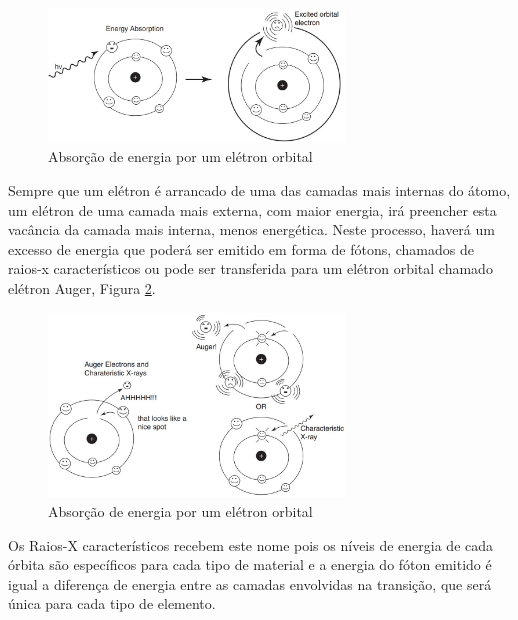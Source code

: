 \documentclass[11pt,a4paper]{article}
\begin{document}
                \begin{figure}[h]
                    \centering
                    \includegraphics[width=0.7\textwidth]{Imagens/absorcaoDeEnergiaPorEletronOrbital.jpg}
                    \caption{Absorção de energia por um elétron orbital}
                    \label{fig:absorcaoDeEnergiaPorEletronOrbital}
                \end{figure}

                Sempre que um elétron é arrancado de uma das camadas mais internas do átomo, um elétron de uma camada mais externa, com maior energia, irá preencher esta vacância da camada mais interna, menos energética. Neste processo, haverá um excesso de energia que poderá ser emitido em forma de fótons, chamados de raios-x característicos ou pode ser transferida para um elétron orbital chamado elétron Auger, Figura \ref{fig:emissaoRaiosXCaracteristicosEEletronAuger}.

                \begin{figure}[h]
                    \centering
                    \includegraphics[width=0.7\textwidth]{Imagens/emissaoRaiosXCaracteristicosEEletronAuger.jpg}
                    \caption{Absorção de energia por um elétron orbital}
                    \label{fig:emissaoRaiosXCaracteristicosEEletronAuger}
                \end{figure}

                Os Raios-X característicos recebem este nome pois os níveis de energia de cada órbita são específicos para cada tipo de material e a energia do fóton emitido é igual a diferença de energia entre as camadas envolvidas na transição, que será única para cada tipo de elemento.
                
\end{document}

